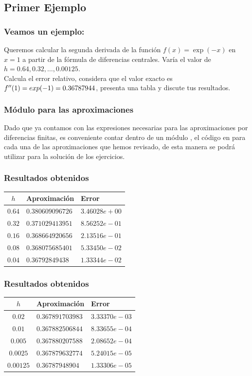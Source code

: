 \subsection*{Primer Ejemplo}
\begin{frame}
\frametitle{Veamos un ejemplo:}
Queremos calcular la segunda derivada de la función $f(x) = \exp(-x)$ en $x=1$ a partir de la fórmula de diferencias centrales. Varía el valor de $h = 0.64, 0.32, \ldots, 0.00125$.
\\
\bigskip
Calcula el error relativo, considera que el valor exacto es ${f}^{\prime \prime}(1) = exp(-1) = 0.36787944$, presenta una tabla y discute tus resultados.
\end{frame}
\begin{frame}
\frametitle{Módulo para las aproximaciones}
Dado que ya contamos con las expresiones necesarias para las aproximaciones por diferencias finitas, es conveniente contar dentro de un módulo , el código en \python{} para cada una de las aproximaciones que hemos revisado, de esta manera se podrá utilizar para la solución de los ejercicios.
\end{frame}
\begin{frame}
\frametitle{Resultados obtenidos}
\begin{table}
\centering
\begin{tabular}{c | l | l}
$h$ & Aproximación & Error \\ \hline
$0.64$ & $0.380609096726$ & $3.46028e+00$ \\ \hline
$0.32$ & $0.371029413951$ & $8.56252e-01$ \\ \hline
$0.16$ & $0.368664920656$ & $2.13516e-01$ \\ \hline
$0.08$ & $0.368075685401$ & $5.33450e-02$ \\ \hline
$0.04$ & $0.36792849438$ & $1.33344e-02$ \\ \hline
\end{tabular}
\end{table}
\end{frame}
\begin{frame}
\frametitle{Resultados obtenidos}
\begin{table}
\centering
\begin{tabular}{c | l | l}
$h$ & Aproximación & Error \\ \hline
$0.02$ & $0.367891703983$ & $3.33370e-03$ \\ \hline
$0.01$ & $0.367882506844$ & $8.33655e-04$ \\ \hline
$0.005$ & $0.367880207588$ & $2.08652e-04$ \\ \hline
$0.0025$ & $0.367879632774$ & $5.24015e-05$ \\ \hline
$0.00125$ & $0.36787948904$ & $1.33306e-05$ \\ \hline
\end{tabular}
\end{table}
\end{frame}
